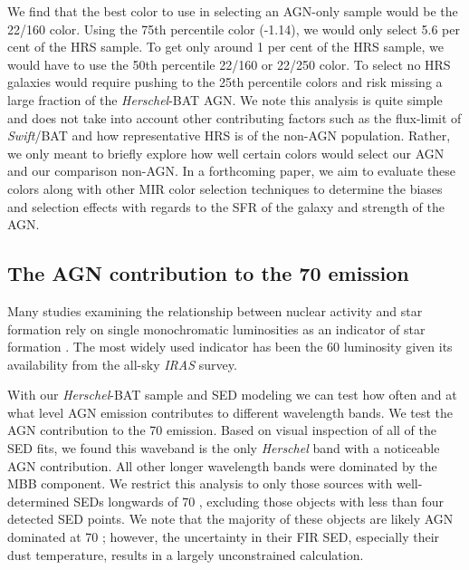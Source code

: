 \documentclass[fleqn, usenatbib]{mnras}
\newcommand{\herschel}{\emph{Herschel}}
\newcommand{\swift}{\textit{Swift}}
\begin{document}
We find that the best color to use in selecting an AGN-only sample would be the 22/160 color. Using the 75th percentile color (-1.14), we would only select 5.6 per cent of the HRS sample. To get only around 1 per cent of the HRS sample, we would have to use the 50th percentile 22/160 or 22/250 color. To select no HRS galaxies would require pushing to the 25th percentile colors and risk missing a large fraction of the \herschel-BAT AGN. {\color{red}We note this analysis is quite simple and does not take into account other contributing factors such as the flux-limit of \swift/BAT and how representative HRS is of the non-AGN population. Rather, we only meant to briefly explore how well certain colors would select our AGN and our comparison non-AGN.} In a forthcoming paper, we aim to evaluate these colors along with other MIR color selection techniques \cite[e.g.][]{Donley:2012qy, Stern:2012mz} to determine the biases and selection effects with regards to the SFR of the galaxy and strength of the AGN.

\subsection{The AGN contribution to the 70 \micron{} emission}\label{sec:agn_70_contribution}
Many studies examining the relationship between nuclear activity and star formation rely on single monochromatic luminosities as an indicator of star formation \cite[e.g.][]{Netzer:2007ve, Netzer:2009lr, Rosario:2012fr}. The most widely used indicator has been the 60 \micron{} luminosity given its availability from the all-sky \textit{IRAS} survey. 

With our \herschel-BAT sample and SED modeling we can test how often and at what level AGN emission contributes to different wavelength bands. We test the AGN contribution to the 70 \micron{} emission. Based on visual inspection of all of the SED fits, we found this waveband is the only \herschel{} band with a noticeable AGN contribution. All other longer wavelength bands were dominated by the MBB component. We restrict this analysis to only those sources with well-determined SEDs longwards of 70 \micron, excluding those objects with less than four detected SED points. We note that the majority of these objects are likely AGN dominated at 70 \micron; however, the uncertainty in their FIR SED, especially their dust temperature, results in a largely unconstrained calculation.
\end{document}
